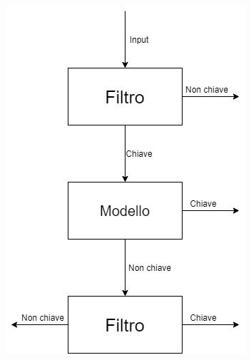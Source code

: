 \documentclass[../../main.tex]{subfiles}
\begin{document}
\begin{figure}[H]
\begin{subfigure}[c]{0.3\textwidth}
            \includegraphics[width=\textwidth]{immagini/5_2/SLBF.png}
            \caption{}
            \label{fig:appartenenzaSLBF}
        \end{subfigure}
        \caption{}
        \label{fig:DifferenzeFiltri}
    \end{figure}
\end{document}
